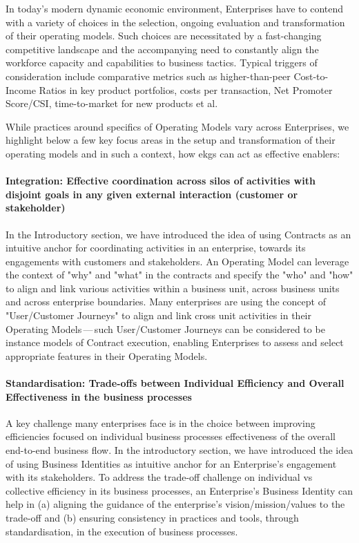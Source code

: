 In today's modern dynamic economic environment, Enterprises have to contend with a variety of choices in the selection,
ongoing evaluation and transformation of their operating models.
Such choices are necessitated by a fast-changing competitive landscape and the accompanying need to constantly
align the workforce capacity and capabilities to business tactics.
Typical triggers of consideration include comparative metrics such as higher-than-peer Cost-to-Income Ratios
in key product portfolios, costs per transaction, Net Promoter Score/CSI, time-to-market for new products et al.

While practices around specifics of Operating Models vary across Enterprises, we highlight below a few key focus
areas in the setup and transformation of their operating models and in such a context,
how \glspl{ekg} can act as effective enablers:

\paragraph*{Integration: Effective coordination across silos of activities with disjoint goals in any
given external interaction (customer or stakeholder)}

In the Introductory section, we have introduced the idea of using Contracts as an intuitive anchor for
coordinating activities in an enterprise, towards its engagements with customers and stakeholders.
An Operating Model can leverage the context of "why" and "what" in the contracts and specify the "who" and "how"
to align and link various activities within a business unit, across business units and across enterprise boundaries.
Many enterprises are using the concept of "User/Customer Journeys" to align and link cross unit activities in their
Operating Models\,---\,such User/Customer Journeys can be considered to be instance models of Contract execution,
enabling Enterprises to assess and select appropriate features in their Operating Models.

\paragraph*{Standardisation: Trade-offs between Individual Efficiency and
Overall Effectiveness in the business processes}

A key challenge many enterprises face is in the choice between improving efficiencies focused on individual
business processes  effectiveness of the overall end-to-end business flow.
In the introductory section, we have introduced the idea of using Business Identities as intuitive anchor for
an Enterprise’s engagement with its stakeholders.
To address the trade-off challenge on individual vs collective efficiency in its business processes,
an Enterprise’s Business Identity can help in
(a) aligning the guidance of the enterprise's vision/mission/values to the trade-off and
(b) ensuring consistency in practices and tools, through standardisation, in the execution of business processes.

